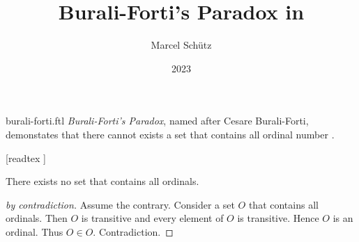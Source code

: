 \documentclass{stex}
\begin{document}
\title{Burali-Forti's Paradox in \Naproche}
\author{Marcel Schütz}
\date{2023}
\maketitle
\begin{smodule}{burali-forti.ftl}
  \noindent \emph{Burali-Forti's Paradox}, named after Cesare Burali-Forti, demonstates that there cannot exists a set that contains all ordinal number \cite{BuraliForti1897}.

  \begin{forthel}
    [readtex ]
  \end{forthel}

  \begin{forthel}
    \begin{theorem*}\label{burali_forti_paradox}
      There exists no set that contains all ordinals.
    \end{theorem*}
    \begin{proof}[ by contradiction]
      Assume the contrary.
      Consider a set $O$ that contains all ordinals.
      Then $O$ is transitive and every element of $O$ is transitive.
      Hence $O$ is an ordinal.
      Thus $O \in O$.
      Contradiction.
    \end{proof}
  \end{forthel}
\end{smodule}
\printbibliography
\end{document}
